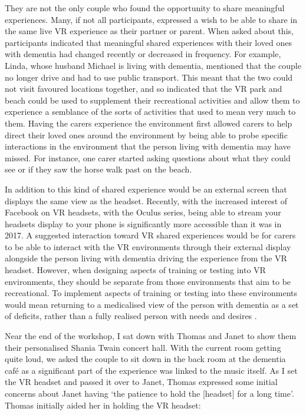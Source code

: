 They are not the only couple who found the opportunity to share meaningful experiences. Many, if not all participants, expressed a wish to be able to share in the same live VR experience as their partner or parent. When asked about this, participants indicated that meaningful shared experiences with their loved ones with dementia had changed recently or decreased in frequency. For example, Linda, whose husband Michael is living with dementia, mentioned that the couple no longer drive and had to use public transport. This meant that the two could not visit favoured locations together, and so indicated that the VR park and beach could be used to supplement their recreational activities and allow them to experience a semblance of the sorts of activities that used to mean very much to them. Having the carers experience the environment first allowed carers to help direct their loved ones around the environment by being able to probe specific interactions in the environment that the person living with dementia may have missed. For instance, one carer started asking questions about what they could see or if they saw the horse walk past on the beach. 

In addition to this kind of shared experience would be an external screen that displays the same view as the headset. Recently, with the increased interest of Facebook on VR headsets, with the Oculus series, being able to stream your headsets display to your phone is significantly more accessible than it was in 2017. A suggested interaction toward VR shared experiences would be for carers to be able to interact with the VR environments through their external display alongside the person living with dementia driving the experience from the VR headset. However, when designing aspects of training or testing into VR environments, they should be separate from those environments that aim to be recreational. To implement aspects of training or testing into these environments would mean returning to a medicalised view of the person with dementia as a set of deficits, rather than a fully realised person with needs and desires \citep{lazar_critical_2017}.

Near the end of the workshop, I sat down with Thomas and Janet to show them their personalised Shania Twain concert hall. With the current room getting quite loud, we asked the couple to sit down in the back room at the dementia café as a significant part of the experience was linked to the music itself. As I set the VR headset and passed it over to Janet, Thomas expressed some initial concerns about Janet having ‘the patience to hold the [headset] for a long time’. Thomas initially aided her in holding the VR headset:

